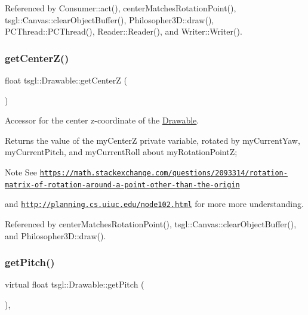 Referenced by Consumer\+::act(), center\+Matches\+Rotation\+Point(), tsgl\+::\+Canvas\+::clear\+Object\+Buffer(), Philosopher3\+D\+::draw(), P\+C\+Thread\+::\+P\+C\+Thread(), Reader\+::\+Reader(), and Writer\+::\+Writer().

\mbox{\label{classtsgl_1_1_drawable_a6a6c0441d94ffebd149f88ae3ab87ced}} 
\subsubsection{\texorpdfstring{get\+Center\+Z()}{getCenterZ()}}
{\footnotesize\ttfamily float tsgl\+::\+Drawable\+::get\+CenterZ (\begin{DoxyParamCaption}{ }\end{DoxyParamCaption})\hspace{0.3cm}{\ttfamily [virtual]}}



Accessor for the center z-\/coordinate of the \hyperlink{classtsgl_1_1_drawable}{Drawable}. 

Returns the value of the my\+CenterZ private variable, rotated by my\+Current\+Yaw, my\+Current\+Pitch, and my\+Current\+Roll about my\+Rotation\+PointZ; \begin{DoxyNote}{Note}
See \href{https://math.stackexchange.com/questions/2093314/rotation-matrix-of-rotation-around-a-point-other-than-the-origin}{\tt https\+://math.\+stackexchange.\+com/questions/2093314/rotation-\/matrix-\/of-\/rotation-\/around-\/a-\/point-\/other-\/than-\/the-\/origin} 

and \href{http://planning.cs.uiuc.edu/node102.html}{\tt http\+://planning.\+cs.\+uiuc.\+edu/node102.\+html} for more more understanding. 
\end{DoxyNote}


Referenced by center\+Matches\+Rotation\+Point(), tsgl\+::\+Canvas\+::clear\+Object\+Buffer(), and Philosopher3\+D\+::draw().

\mbox{\label{classtsgl_1_1_drawable_a124df4cd376a550dd52a2b8ed7dd3151}} 
\subsubsection{\texorpdfstring{get\+Pitch()}{getPitch()}}
{\footnotesize\ttfamily virtual float tsgl\+::\+Drawable\+::get\+Pitch (\begin{DoxyParamCaption}{ }\end{DoxyParamCaption})\hspace{0.3cm}{\ttfamily [inline]}, {\ttfamily [virtual]}}



